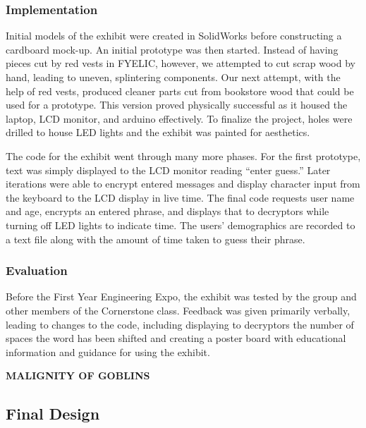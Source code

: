 \documentclass[conference]{IEEEtran}
\begin{document}
\subsubsection{Implementation}

\par Initial models of the exhibit were created in SolidWorks before constructing a cardboard mock-up.  An initial prototype was then started.  Instead of having pieces cut by red vests in FYELIC, however, we attempted to cut scrap wood by hand, leading to uneven, splintering components.  Our next attempt, with the help of red vests, produced cleaner parts cut from bookstore wood that could be used for a prototype.  This version proved physically successful as it housed the laptop, LCD monitor, and arduino effectively.  To finalize the project, holes were drilled to house LED lights and the exhibit was painted for aesthetics.  
    \par The code for the exhibit went through many more phases.  For the first prototype, text was simply displayed to the LCD monitor reading ``enter guess.''  Later iterations were able to encrypt entered messages and display character input from the keyboard to the LCD display in live time.  The final code requests user name and age, encrypts an entered phrase, and displays that to decryptors while turning off LED lights to indicate time.  The users’ demographics are recorded to a text file along with the amount of time taken to guess their phrase.  

\subsubsection{Evaluation}

\par Before the First Year Engineering Expo, the exhibit was tested by the group and other members of the Cornerstone class.  Feedback was given primarily verbally, leading to changes to the code, including displaying to decryptors the number of spaces the word has been shifted and creating a poster board with educational information and guidance for using the exhibit.


\vspace{10pt} \LARGE \textbf{MALIGNITY OF GOBLINS} \normalsize

\subsection{Final Design}
\end{document}
